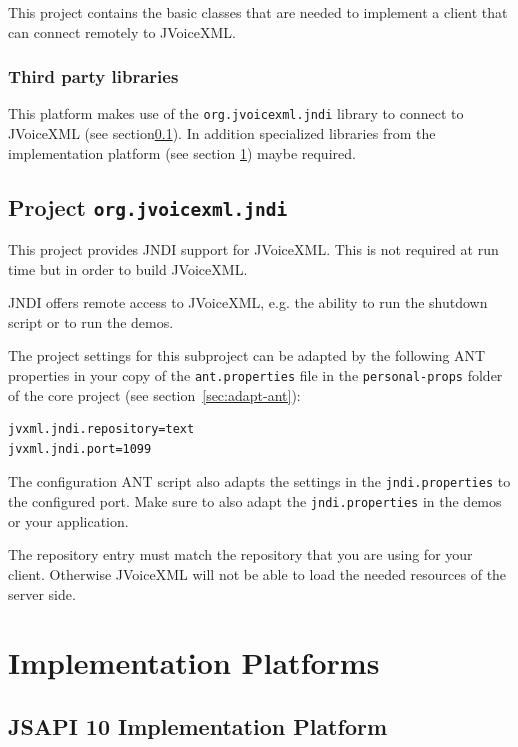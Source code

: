 \documentclass[11pt,a4paper]{article}
\begin{document}
This project contains the basic classes that are needed to implement a
client that can connect remotely to JVoiceXML.

\subsubsection{Third party libraries}

This platform makes use of the \lstinline{org.jvoicexml.jndi} library
to connect to JVoiceXML (see section\ref{sec:jndi}). In addition specialized
libraries from the implementation platform (see section
\ref{sec:implementation-platforms}) maybe required.

\subsection{Project \texttt{org.jvoicexml.jndi}}
\label{sec:jndi}

This project provides JNDI support for JVoiceXML. This is not required at run
time but in order to build JVoiceXML.

JNDI offers remote access to JVoiceXML, e.g. the ability to run the
shutdown script or to run the demos.

The project settings for this subproject can be adapted by the following ANT
properties in your copy of the \texttt{ant.properties} file in the
\texttt{personal-props} folder of the core project (see 
section~\ref{sec:adapt-ant}):
\begin{lstlisting}
jvxml.jndi.repository=text
jvxml.jndi.port=1099
\end{lstlisting}

The configuration ANT script also adapts the settings in the
\texttt{jndi.properties} to the configured port. Make sure to also adapt
the \texttt{jndi.properties} in the demos or your application.

The repository entry must match the repository that you are using for your
client. Otherwise JVoiceXML will not be able to load the needed resources of
the server side.

\section{Implementation Platforms}
\label{sec:implementation-platforms}

\subsection{JSAPI 10 Implementation Platform}
\label{sec:implementation-jsapi10}
\end{document}
